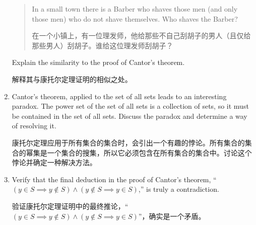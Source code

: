 \begin{enumerate}
    \begin{quote}
    In a small town there is a Barber who shaves those men (and
    only those men) who do not shave themselves.
    Who shaves
    the Barber?
    
    在一个小镇上，有一位理发师，他给那些不自己刮胡子的男人（且仅给那些男人）刮胡子。谁给这位理发师刮胡子？
    \end{quote}
    
    Explain the similarity to the proof of Cantor's theorem.
    
    解释其与康托尔定理证明的相似之处。
    \wbvfill
    
    \workbookpagebreak
    
    \item Cantor's theorem, applied to the set of all sets leads to an interesting
    paradox.
    The power set of the set of all sets is a collection of sets, so
    it must be contained in the set of all sets.
    Discuss the paradox and
    determine a way of resolving it.
    
    康托尔定理应用于所有集合的集合时，会引出一个有趣的悖论。所有集合的集合的幂集是一个集合的搜集，所以它必须包含在所有集合的集合中。讨论这个悖论并确定一种解决方法。
    
    \wbvfill
    
    \item Verify that the final deduction in the proof of Cantor's theorem, 
    ``$(y \in S  \implies  y \notin S) \land  (y \notin S \implies y \in S)$,'' 
    is truly a contradiction.
    
    验证康托尔定理证明中的最终推论，“$(y \in S  \implies  y \notin S) \land  (y \notin S \implies y \in S)$”，确实是一个矛盾。
    \wbvfill
    
    \workbookpagebreak
    
    \end{enumerate}
    
